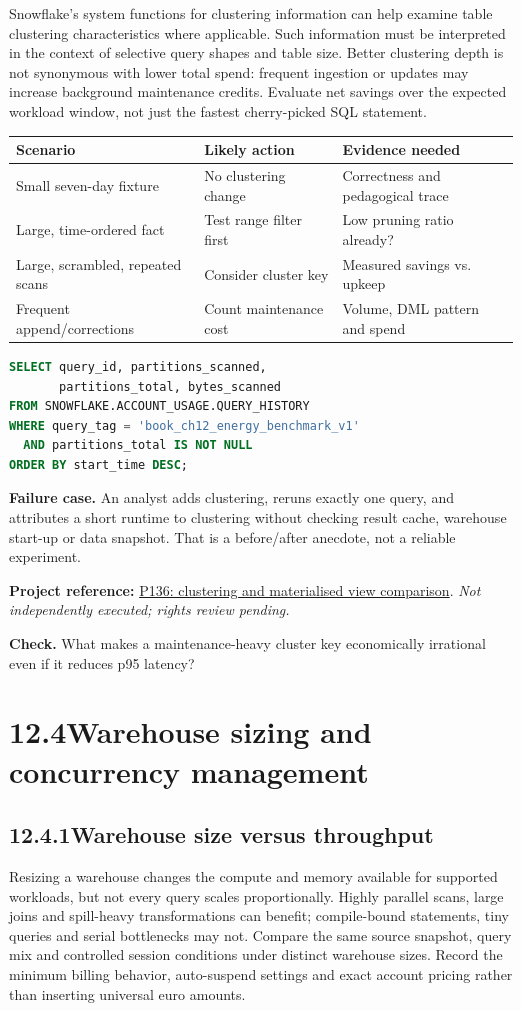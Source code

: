 \documentclass[11pt,twoside]{article}
\newcommand{\topic}[2]{\subsection*{#1\quad #2}}
\newcommand{\repo}[2]{\par\begingroup\fontsize{8.0}{9.6}\selectfont\sffamily\color{inkgray}\textbf{Project reference:} \href{#2}{#1}. \textit{Not independently executed; rights review pending.}\par\endgroup}
\begin{document}
Snowflake's system functions for clustering information can help examine table clustering characteristics where applicable. Such information must be interpreted in the context of selective query shapes and table size. Better clustering depth is not synonymous with lower total spend: frequent ingestion or updates may increase background maintenance credits. Evaluate net savings over the expected workload window, not just the fastest cherry-picked SQL statement.
\begin{center}\renewcommand{\arraystretch}{1.12}\begin{tabularx}{\linewidth}{@{}p{35mm}XX@{}}\toprule
\textbf{Scenario}&\textbf{Likely action}&\textbf{Evidence needed}\\\midrule
Small seven-day fixture&No clustering change&Correctness and pedagogical trace\\
Large, time-ordered fact&Test range filter first&Low pruning ratio already?\\
Large, scrambled, repeated scans&Consider cluster key&Measured savings vs. upkeep\\
Frequent append/corrections&Count maintenance cost&Volume, DML pattern and spend\\\bottomrule\end{tabularx}\end{center}
\begin{lstlisting}[language=SQL,caption={Read-only partition history fields (approved role).}]
SELECT query_id, partitions_scanned,
       partitions_total, bytes_scanned
FROM SNOWFLAKE.ACCOUNT_USAGE.QUERY_HISTORY
WHERE query_tag = 'book_ch12_energy_benchmark_v1'
  AND partitions_total IS NOT NULL
ORDER BY start_time DESC;
\end{lstlisting}
\textbf{Failure case.} An analyst adds clustering, reruns exactly one query, and attributes a short runtime to clustering without checking result cache, warehouse start-up or data snapshot. That is a before/after anecdote, not a reliable experiment.
\repo{P136: clustering and materialised view comparison}{https://github.com/subhamay-bhattacharyya/snowflake-de-clustering-mv}
\textbf{Check.} What makes a maintenance-heavy cluster key economically irrational even if it reduces p95 latency?
\newpage
\section*{12.4\quad Warehouse sizing and concurrency management}
\topic{12.4.1}{Warehouse size versus throughput}
Resizing a warehouse changes the compute and memory available for supported workloads, but not every query scales proportionally. Highly parallel scans, large joins and spill-heavy transformations can benefit; compile-bound statements, tiny queries and serial bottlenecks may not. Compare the same source snapshot, query mix and controlled session conditions under distinct warehouse sizes. Record the minimum billing behavior, auto-suspend settings and exact account pricing rather than inserting universal euro amounts.
\end{document}
